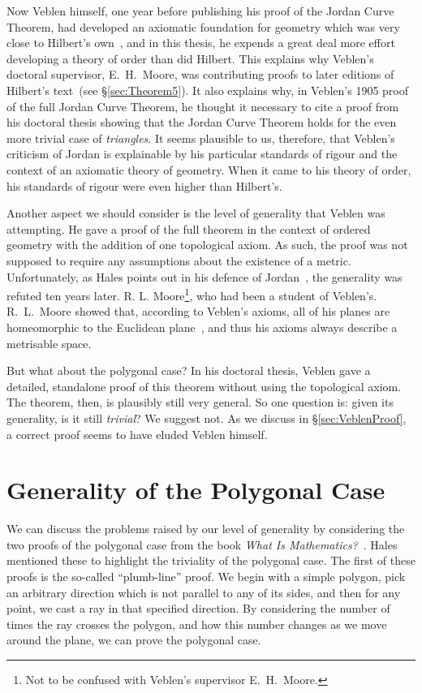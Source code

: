 Now Veblen himself, one year before publishing his proof of the Jordan Curve Theorem, had developed an axiomatic foundation for geometry which was very close to Hilbert's own~\cite{Veblenphd}, and in this thesis, he expends a great deal more effort developing a theory of order than did Hilbert. This explains why Veblen's doctoral supervisor, E.~H.~Moore, was contributing proofs to later editions of Hilbert's text~(see \S\ref{sec:Theorem5}). It also explains why, in Veblen's 1905 proof of the full Jordan Curve Theorem, he thought it necessary to cite a proof from his doctoral thesis showing that the Jordan Curve Theorem holds for the even more trivial case of \emph{triangles}. It seems plausible to us, therefore, that Veblen's criticism of Jordan is explainable by his particular standards of rigour and the context of an axiomatic theory of geometry. When it came to his theory of order, his standards of rigour were even higher than Hilbert's.

Another aspect we should consider is the level of generality that Veblen was attempting. He gave a proof of the full theorem in the context of ordered geometry with the addition of one topological axiom. As such, the proof was not supposed to require any assumptions about the existence of a metric. Unfortunately, as Hales points out in his defence of Jordan~\cite{HalesJordansProof}, the generality was refuted ten years later. R. L. Moore\footnote{Not to be confused with Veblen's supervisor E.~H.~Moore.}, who had been a student of Veblen's. R.~L.~Moore showed that, according to Veblen's axioms, all of his planes are homeomorphic to the Euclidean plane~\cite{MooreSitus}, and thus his axioms always describe a metrisable space.

But what about the polygonal case? In his doctoral thesis, Veblen gave a detailed, standalone proof of this theorem without using the topological axiom. The theorem, then, is plausibly still very general. So one question is: given its generality, is it still \emph{trivial}? We suggest not. As we discuss in \S\ref{sec:VeblenProof}, a correct proof seems to have eluded Veblen himself.

\section{Generality of the Polygonal Case}\label{sec:JordanCurveGenerality}
We can discuss the problems raised by our level of generality by considering the two proofs of the polygonal case from the book \emph{What Is Mathematics?}~\cite{WhatIsMathematics}. Hales mentioned these to highlight the triviality of the polygonal case. The first of these proofs is the so-called ``plumb-line'' proof. We begin with a simple polygon, pick an arbitrary direction which is not parallel to any of its sides, and then for any point, we cast a ray in that specified direction. By considering the number of times the ray crosses the polygon, and how this number changes as we move around the plane, we can prove the polygonal case.

